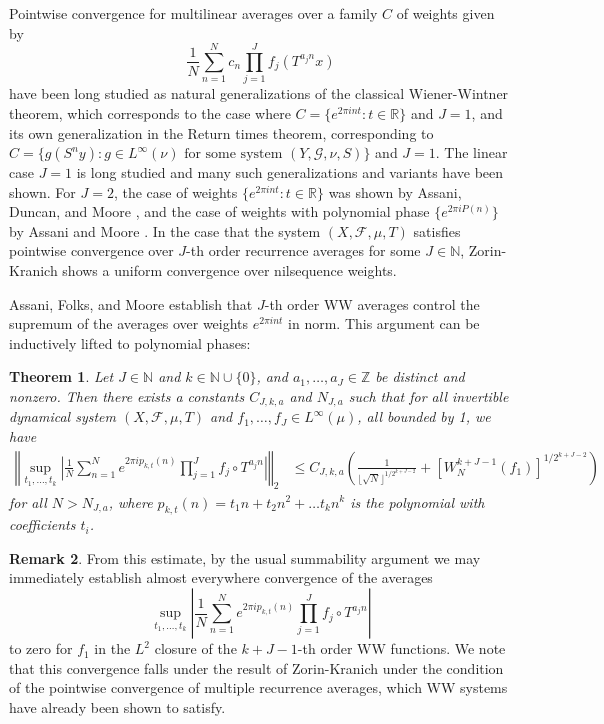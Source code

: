 \documentclass[11pt, oneside]{amsart}   	%
\newcommand{\R}{\mathbb{R}}
\newcommand{\1}{\mathbbm{1}}
\newcommand{\N}{\mathbb{N}}
\newcommand{\floor}[1]{\lfloor#1\rfloor}
\newtheorem{theorem}{Theorem}[section]
\theoremstyle{definition}
\newtheorem{remark}[theorem]{Remark}
\begin{document}
Pointwise convergence for multilinear averages over a family $C$ of weights given by
$$\frac{1}{N}\sum_{n=1}^N c_n \prod_{j=1}^J f_j(T^{a_j n} x)$$
have been long studied as natural generalizations of the classical Wiener-Wintner theorem, which corresponds to the case where $C = \{ e^{2\pi i n t} : t\in \R\}$ and $J = 1$, and its own generalization in the Return times theorem, corresponding to $C = \{g(S^n y) : g\in L^\infty(\nu) \text{ for some system }(Y, \mathcal{G}, \nu, S)\}$ and $J=1$. The linear case $J=1$ is long studied and many such generalizations and variants have been shown. For $J=2$, the case of weights $\{ e^{2\pi i n t} : t\in \R\}$ was shown by Assani, Duncan, and Moore \cite{ADM2016}, and the case of weights with polynomial phase $\{e^{2\pi i P(n)}\}$ by Assani and Moore \cite{AssaniMoore}. In the case that the system $(X, \mathcal{F}, \mu, T)$ satisfies pointwise convergence over $J$-th order recurrence averages for some $J\in \N$, Zorin-Kranich \cite{ZK2015} shows a uniform convergence over nilsequence weights.

Assani, Folks, and Moore \cite{assani2024higherorderwienerwintnersystems} establish that $J$-th order WW averages control the supremum of the averages over weights $e^{2\pi i n t}$ in norm. This argument can be inductively lifted to polynomial phases:

\begin{theorem} \label{T:polynomial WW estimate}
Let $J \in \N$ and $k\in \N \cup \{0\}$, and $a_1, \dots, a_J\in \mathbb{Z}$ be distinct and nonzero. Then there exists a constants $C_{J, k, a}$ and $N_{J, a}$ such that for all invertible dynamical system $(X, \mathcal{F}, \mu, T)$ and $f_1, \dots, f_J\in L^\infty (\mu)$, all bounded by 1, we have
\begin{align}\label{E:poly bound}
\left\Vert \sup_{t_1, \dots, t_k} \left|\frac{1}{N}\sum_{n=1}^N e^{2\pi i p_{k, t}(n)} \prod_{j=1}^J f_j \circ T^{a_j n} \right| \right\Vert_2 &\leq C_{J, k, a}\left(\frac{1}{\floor{\sqrt{N}}^{1/2^{k+J-2}}} + \left[W_N^{k+J-1}(f_1)\right]^{1/2^{k+J-2}}\right)
\end{align}
for all $N> N_{J, a}$, where $p_{k, t}(n) = t_1 n + t_2n^2 + \dots t_kn^k$ is the polynomial with coefficients $t_i$.
\end{theorem}

\begin{remark}
From this estimate, by the usual summability argument we may immediately establish almost everywhere convergence of the averages
$$\sup_{t_1, \dots, t_k} \left|\frac{1}{N}\sum_{n=1}^N e^{2\pi i p_{k, t}(n)} \prod_{j=1}^J f_j \circ T^{a_j n} \right|$$
to zero for $f_1$ in the $L^2$ closure of the $k+J-1$-th order WW functions. We note that this convergence falls under the result of Zorin-Kranich \cite{ZK2015} under the condition of the pointwise convergence of multiple recurrence averages, which WW systems have already been shown to satisfy.
\end{remark}
\end{document}
